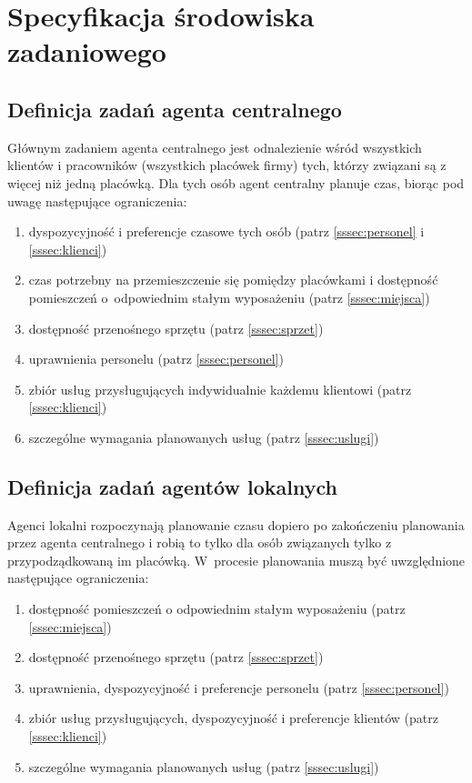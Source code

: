 ﻿\section{Specyfikacja środowiska zadaniowego}
\subsection{Definicja zadań agenta centralnego}\label{ssec:zadaniaCentralny}
Głównym zadaniem agenta centralnego jest odnalezienie wśród wszystkich klientów
i pracowników (wszystkich placówek firmy) tych, którzy związani są z więcej niż jedną placówką.
Dla tych osób agent centralny planuje czas, biorąc pod uwagę następujące ograniczenia:
\begin{enumerate}
	\item{dyspozycyjność i preferencje czasowe tych osób (patrz \ref{sssec:personel} i \ref{sssec:klienci})}
	\item{czas potrzebny na przemieszczenie się pomiędzy placówkami
		i dostępność pomieszczeń o~odpowiednim stałym wyposażeniu (patrz \ref{sssec:miejsca})}
	\item{dostępność przenośnego sprzętu (patrz \ref{sssec:sprzet})}
	\item{uprawnienia personelu (patrz \ref{sssec:personel})}
	\item{zbiór usług przysługujących indywidualnie każdemu klientowi (patrz \ref{sssec:klienci})}
	\item{szczególne wymagania planowanych usług (patrz \ref{sssec:uslugi})}
\end{enumerate}

\subsection{Definicja zadań agentów lokalnych}\label{ssec:zadaniaLokalny}
Agenci lokalni rozpoczynają planowanie czasu dopiero po zakończeniu planowania przez
agenta centralnego i robią to tylko dla osób związanych tylko z przypodządkowaną im placówką.
W~procesie planowania muszą być uwzględnione następujące ograniczenia:
\begin{enumerate}
	\item{dostępność pomieszczeń o odpowiednim stałym wyposażeniu (patrz \ref{sssec:miejsca})}
	\item{dostępność przenośnego sprzętu (patrz \ref{sssec:sprzet})}
	\item{uprawnienia, dyspozycyjność i preferencje personelu (patrz \ref{sssec:personel})}
	\item{zbiór usług przysługujących, dyspozycyjność
		i preferencje klientów (patrz \ref{sssec:klienci})}
	\item{szczególne wymagania planowanych usług (patrz \ref{sssec:uslugi})}
\end{enumerate}


